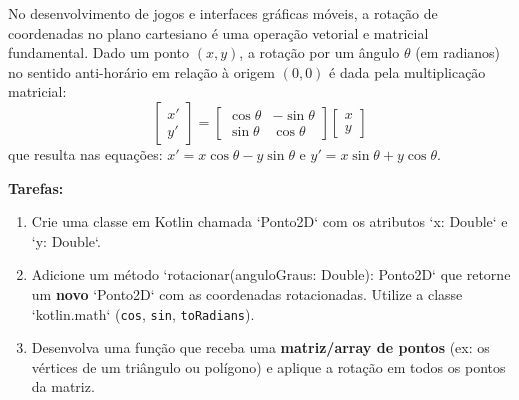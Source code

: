 \documentclass[12pt]{article}
\begin{document}
\vspace{0.2cm}
\noindent
No desenvolvimento de jogos e interfaces gráficas móveis, a rotação de coordenadas no plano cartesiano é uma operação vetorial e matricial fundamental. Dado um ponto $(x, y)$, a rotação por um ângulo $\theta$ (em radianos) no sentido anti-horário em relação à origem $(0,0)$ é dada pela multiplicação matricial:
\[
\begin{bmatrix} x' \\ y' \end{bmatrix} = \begin{bmatrix} \cos\theta & -\sin\theta \\ \sin\theta & \cos\theta \end{bmatrix} \begin{bmatrix} x \\ y \end{bmatrix}
\]
que resulta nas equações: $x' = x\cos\theta - y\sin\theta$ e $y' = x\sin\theta + y\cos\theta$.

\vspace{0.2cm}
\noindent
\textbf{Tarefas:}
\begin{enumerate}[label=\alph*), leftmargin=1.5em]
  \item Crie uma classe em Kotlin chamada `Ponto2D` com os atributos `x: Double` e `y: Double`.
  \item Adicione um método `rotacionar(anguloGraus: Double): Ponto2D` que retorne um \textbf{novo} `Ponto2D` com as coordenadas rotacionadas. Utilize a classe `kotlin.math` (\texttt{cos}, \texttt{sin}, \texttt{toRadians}).
  \item Desenvolva uma função que receba uma \textbf{matriz/array de pontos} (ex: os vértices de um triângulo ou polígono) e aplique a rotação em todos os pontos da matriz.
\end{enumerate}
\end{document}
